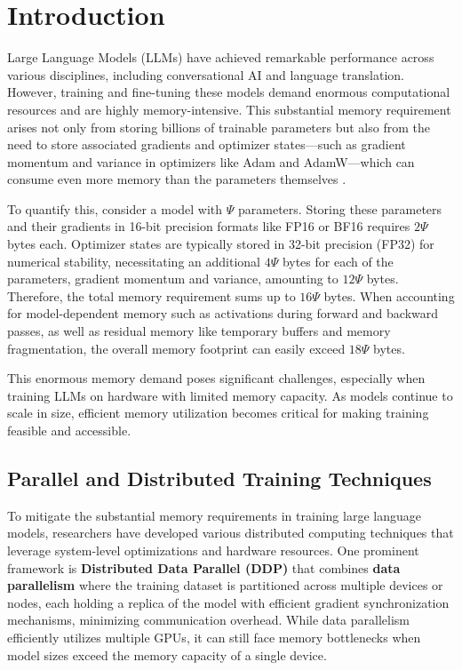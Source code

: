 
\vspace{-8mm}
\section{Introduction}
Large Language Models (LLMs) have achieved remarkable performance across various disciplines, including conversational AI and language translation. However, training and fine-tuning these models demand enormous computational resources and are highly memory-intensive. This substantial memory requirement arises not only from storing billions of trainable parameters but also from the need to store associated gradients and optimizer states—such as gradient momentum and variance in optimizers like Adam and AdamW—which can consume even more memory than the parameters themselves \citep{raffelExploringLimitsTransfer2020,touvronLlamaOpenFoundation2023,chowdheryPaLMScalingLanguage2022}.

To quantify this, consider a model with $\Psi$ parameters. Storing these parameters and their gradients in 16-bit precision formats like FP16 or BF16 requires $2\Psi$ bytes each. Optimizer states are typically stored in 32-bit precision (FP32) for numerical stability, necessitating an additional $4\Psi$ bytes for each of the parameters, gradient momentum and variance, amounting to $12\Psi$ bytes. Therefore, the total memory requirement sums up to $16\Psi$ bytes. When accounting for model-dependent memory such as activations during forward and backward passes, as well as residual memory like temporary buffers and memory fragmentation, the overall memory footprint can easily exceed $18\Psi$ bytes.

This enormous memory demand poses significant challenges, especially when training LLMs on hardware with limited memory capacity. As models continue to scale in size, efficient memory utilization becomes critical for making training feasible and accessible.


% 

\subsection{Parallel and Distributed Training Techniques}
To mitigate the substantial memory requirements in training large language models, researchers have developed various distributed computing techniques that leverage system-level optimizations and hardware resources. One prominent framework is \textbf{Distributed Data Parallel (DDP)} that combines \textbf{data parallelism} where the training dataset is partitioned across multiple devices or nodes, each holding a replica of the model with efficient gradient synchronization mechanisms, minimizing communication overhead. While data parallelism efficiently utilizes multiple GPUs, it can still face memory bottlenecks when model sizes exceed the memory capacity of a single device.


